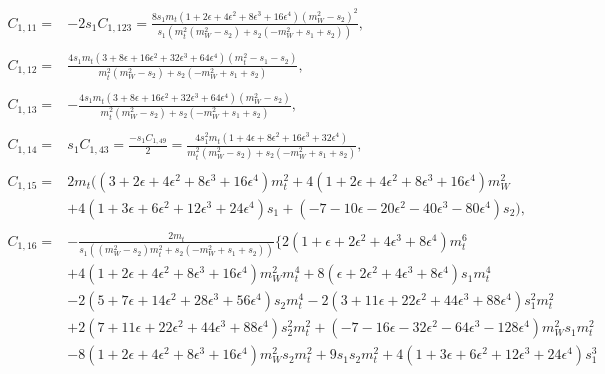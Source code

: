 \documentclass[twocolumn,aps,showpacs,nofootinbib,superscriptaddress,prd]{revtex4-2}
\begin{document}
\begin{widetext}
\begin{align}
\nonumber\\
C_{1,11}=&-2s_1C_{1,123}=\frac{8s_1m_t\left(1 +2 \epsilon +4 \epsilon^2 +8 \epsilon^3 +16 \epsilon^4\right)\left(m_W^2-s_2\right)^2}{s_1\left(m_t^2
\left(m_W^2-s_2\right)+s_2\left(-m_W^2+s_1+s_2\right)\right)}
,\nonumber\\
\nonumber\\
C_{1,12}=&\frac{4s_1m_t\left(3 +8 \epsilon +16 \epsilon^2 +32 \epsilon^3 +64 \epsilon^4\right)\left(m_t^2-s_1-s_2\right)}{m_t^2
\left(m_W^2-s_2\right)+s_2\left(-m_W^2+s_1+s_2\right)}
,\nonumber\\
\nonumber\\
C_{1,13}=&-\frac{4s_1m_t\left(3 +8 \epsilon +16 \epsilon^2 +32 \epsilon^3 +64 \epsilon^4\right)\left(m_W^2-s_2\right)}{m_t^2
\left(m_W^2-s_2\right)+s_2\left(-m_W^2+s_1+s_2\right)}
,\nonumber\\
\nonumber\\
C_{1,14}=&s_1C_{1,43}=\frac{-s_1C_{1,49}}{2}=\frac{4s_1^2m_t\left(1 +4 \epsilon +8 \epsilon^2 +16 \epsilon^3 +32 \epsilon^4\right)}{m_t^2\left(m_W^2-s_2\right)+s_2
\left(-m_W^2+s_1+s_2\right)}
,\nonumber\\
\nonumber\\
C_{1,15}=&2m_t(\left(3 +2 \epsilon +4 \epsilon^2 +8 \epsilon^3 +16 \epsilon^4\right)m_t^2+4\left(1 +2 \epsilon +4 \epsilon^2 +8 \epsilon^3 +16 \epsilon^4\right)m_W^2
\nonumber\\&
+4\left(1 +3 \epsilon +6 \epsilon^2 +12 \epsilon^3 +24 \epsilon^4\right)s_1+\left(-7 -10 \epsilon -20 \epsilon^2 -40 \epsilon^3 -80 \epsilon^4\right)s_2)
,\nonumber\\
\nonumber\\
C_{1,16}=&-\frac{2m_t}{s_1\left(\left(m_W^2-s_2\right)m_t^2+s_2\left(-m_W^2+s_1+s_2\right)\right)}\{2\left(1 +\epsilon +2 \epsilon^2 +4 \epsilon^3 +8 \epsilon^4\right)m_t^6
\nonumber\\&
+4\left(1 +2 \epsilon +4 \epsilon^2 +8 \epsilon^3 +16 \epsilon^4\right)m_W^2m_t^4+8\left(\epsilon+2\epsilon^2+4\epsilon^3+8\epsilon^4\right)s_1m_t^4
\nonumber\\&
-2\left(5 +7 \epsilon +14 \epsilon^2 +28 \epsilon^3 +56 \epsilon^4\right)s_2m_t^4-2\left(3 +11 \epsilon +22 \epsilon^2 +44 \epsilon^3 +88 \epsilon^4\right)s_1^2m_t^2
\nonumber\\&
+2\left(7 +11 \epsilon +22 \epsilon^2 +44 \epsilon^3 +88 \epsilon^4\right)s_2^2m_t^2+\left(-7 -16 \epsilon -32 \epsilon^2 -64 \epsilon^3 -128 \epsilon^4\right)m_W^2s_1m_t^2
\nonumber\\&
-8\left(1 +2 \epsilon +4 \epsilon^2 +8 \epsilon^3 +16 \epsilon^4\right)m_W^2s_2m_t^2+9s_1s_2m_t^2+4\left(1 +3 \epsilon +6 \epsilon^2 +12 \epsilon^3 +24 \epsilon^4\right)s_1^3

\end{align}
\end{widetext}
\end{document}
